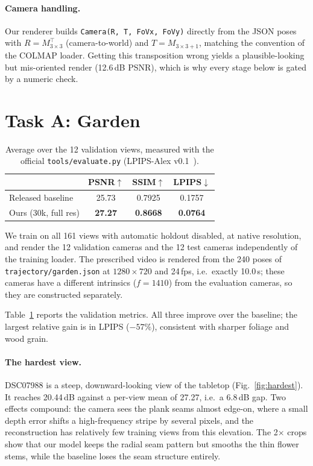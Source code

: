 \documentclass[10pt,twocolumn,letterpaper]{article}
\begin{document}
\paragraph{Camera handling.} Our renderer builds \texttt{Camera(R, T, FoVx, FoVy)} directly from
the JSON poses with $R=M_{3\times3}^{\top}$ (camera-to-world) and $T=M_{3\times3+1}$, matching the
convention of the COLMAP loader. Getting this transposition wrong yields a plausible-looking but
mis-oriented render (12.6\,dB PSNR), which is why every stage below is gated by a numeric check.

\section{Task A: Garden}

\begin{table}[t]
\centering\small
\setlength{\tabcolsep}{4pt}
\begin{tabular}{lccc}
\hline
 & PSNR$\uparrow$ & SSIM$\uparrow$ & LPIPS$\downarrow$\\
\hline
Released baseline & 25.73 & 0.7925 & 0.1757\\
Ours (30k, full res) & \textbf{27.27} & \textbf{0.8668} & \textbf{0.0764}\\
\hline
\end{tabular}
\caption{Average over the 12 validation views, measured with the official
\texttt{tools/evaluate.py} (LPIPS-Alex v0.1~\cite{zhang2018}).}
\label{tab:garden}
\end{table}

We train on all 161 views with automatic holdout disabled, at native resolution, and render the
12 validation cameras and the 12 test cameras independently of the training loader. The
prescribed video is rendered from the 240 poses of \texttt{trajectory/garden.json} at
$1280\times720$ and 24\,fps, i.e.\ exactly 10.0\,s; these cameras have a different intrinsics
($f=1410$) from the evaluation cameras, so they are constructed separately.

Table~\ref{tab:garden} reports the validation metrics. All three improve over the baseline;
the largest relative gain is in LPIPS ($-57\%$), consistent with sharper foliage and wood grain.

\paragraph{The hardest view.} DSC07988 is a steep, downward-looking view of the tabletop
(Fig.~\ref{fig:hardest}). It reaches 20.44\,dB against a per-view mean of 27.27, i.e.\ a 6.8\,dB
gap. Two effects compound: the camera sees the plank seams almost edge-on, where a small depth
error shifts a high-frequency stripe by several pixels, and the reconstruction has relatively few
training views from this elevation. The 2$\times$ crops show that our model keeps the radial seam
pattern but smooths the thin flower stems, while the baseline loses the seam structure entirely.
\end{document}

